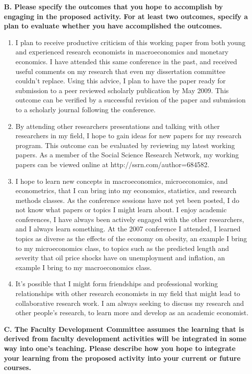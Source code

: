 \documentclass[12pt]{article}
\newcommand{\be}{\begin{enumerate}}
\newcommand{\ee}{\end{enumerate}}
\begin{document}
\textbf{B. Please specify the outcomes that you hope to accomplish by engaging in the proposed activity.  For at least two outcomes, specify a plan to evaluate whether you have accomplished the outcomes.} \\

\be
\item I plan to receive productive criticism of this working paper from both young and experienced research economists in macroeconomics and monetary economics.  I have attended this same conference in the past, and received useful comments on my research that even my dissertation committee couldn't replace.  Using this advice, I plan to have the paper ready for submission to a peer reviewed scholarly publication by May 2009.  This outcome can be verified by a successful revision of the paper and submission to a scholarly journal following the conference.

\item By attending other researchers presentations and talking with other researchers in my field, I hope to gain ideas for new papers for my research program.  This outcome can be evaluated by reviewing my latest working papers.  As a member of the Social Science Research Network, my working papers can be viewed online at http://ssrn.com/author=684582.

\item I hope to learn new concepts in macroeconomics, microeconomics, and econometrics, that I can bring into my economics, statistics, and research methods classes.  As the conference sessions have not yet been posted, I do not know what papers or topics I might learn about.  I enjoy academic conferences, I have always been actively engaged with the other researchers, and I always learn something.  At the 2007 conference I attended, I learned topics as diverse as the effects of the economy on obesity, an example I bring to my microeconomics class, to topics such as the predicted length and severity that oil price shocks have on unemployment and inflation, an example I bring to my macroeconomics class.

\item It's possible that I might form friendships and professional working relationships with other research economists in my field that might lead to collaborative research work.  I am always seeking to discuss my research and other people's research, to learn more and develop as an academic economist.
\ee

\textbf{C. The Faculty Development Committee assumes the learning that is derived from faculty development activities will be integrated in some way into one's teaching.  Please describe how you hope to integrate your learning from the proposed activity into your current or future courses.} \\
\end{document}
